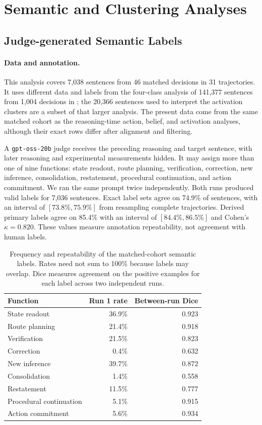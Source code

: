 \documentclass{article}
\begin{document}
\section{Semantic and Clustering Analyses}\label{app:semantic-clustering}
\subsection{Judge-generated Semantic Labels}
\label{app:judge_semantic_labels}

\paragraph{Data and annotation.}
This analysis covers 7,038 sentences from 46 matched decisions in 31
trajectories. It uses different data and labels from the four-class analysis of
141,377 sentences from 1,004 decisions in ; the 20,366
sentences used to interpret the activation clusters are a subset of that larger
analysis. The present data come from the same matched cohort as the
reasoning-time action, belief, and activation analyses, although their exact
rows differ after alignment and filtering.

A \texttt{gpt-oss-20b} judge receives the preceding reasoning
and target sentence, with later reasoning and experimental measurements hidden.
It may assign more than one of nine functions: state readout, route planning,
verification, correction, new inference, consolidation, restatement,
procedural continuation, and action commitment. We ran the same prompt twice
independently. Both runs produced valid labels for 7,036 sentences. Exact label
sets agree on 74.9\% of sentences, with an interval of
$[73.8\%,75.9\%]$ from resampling complete trajectories. Derived primary
labels agree on 85.4\% with an interval of $[84.4\%,86.5\%]$ and Cohen's
$\kappa=0.820$. These values measure annotation
repeatability, not agreement with human labels.

\begin{table}[htbp]
\centering
\small
\begin{tabular}{lrr}
\toprule
Function & Run 1 rate & Between-run Dice \\
\midrule
State readout & 36.9\% & 0.923 \\
Route planning & 21.4\% & 0.918 \\
Verification & 21.5\% & 0.823 \\
Correction & 0.4\% & 0.632 \\
New inference & 39.7\% & 0.872 \\
Consolidation & 1.4\% & 0.558 \\
Restatement & 11.5\% & 0.777 \\
Procedural continuation & 5.1\% & 0.915 \\
Action commitment & 5.6\% & 0.934 \\
\bottomrule
\end{tabular}
\caption{Frequency and repeatability of the matched-cohort semantic labels.
Rates need not sum to 100\% because labels may overlap. Dice measures agreement
on the positive examples for each label across two independent runs.}
\label{tab:semantic-label-repeatability}
\end{table}
\end{document}
